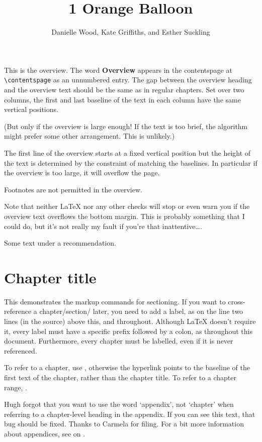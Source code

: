 \documentclass[embargoed]{grattan}
\title{1 Orange Balloon}
\author{Danielle Wood, Kate Griffiths, and Esther Suckling}
\begin{document}
\begin{overview}
This is the overview. 
The word \textbf{Overview} appears in the contentspage at \verb=\contentspage= as an unnumbered entry.
The gap between the overview heading and the overview text should be the same as in regular chapters. 
Set over two columns, the first and last baseline of the text in each column have the same vertical positions.

(But only if the overview is large enough!
If the text is too brief, the algorithm might prefer some other arrangement.
This is unlikely.) 

The first line of the overview starts at a fixed vertical position but the height of the text is determined by the constraint of matching the baselines.
In particular if the overview is too large, it will overflow the page.

Footnotes are not permitted in the overview.

Note that neither \LaTeX{} nor any other checks will stop or even warn you if the overview text overflows the bottom margin.
This is probably something that I could do, but it's not really my fault if you're that inattentive\dots . 
\end{overview}

\begin{recommendations}
\label{rec:use-labels}
Some text under a recommendation.
\end{recommendations}

\contentspage

\chapter{Chapter title}\label{chap:example}
This demonstrates the markup commands for sectioning. 
If you want to cross-reference a chapter/section/\etc{} later, you need to add a label, as on the line two lines (in the source) above this, and throughout.
Although \LaTeX{} doesn't require it, every label must have a specific prefix followed by a colon, as throughout this document.
Furthermore, every chapter must be labelled, even if it is never referenced.

To refer to a chapter, use , %
otherwise the hyperlink points to the baseline of the first text of the chapter, rather than the chapter title.
To refer to a chapter range, .

Hugh forgot that you want to use the word `appendix', not `chapter' when referring to a chapter-level heading in the appendix.
If you can see this text, that bug should be fixed.
Thanks to Carmela for filing. 
For a bit more information about appendices, see  on . 
\end{document}
